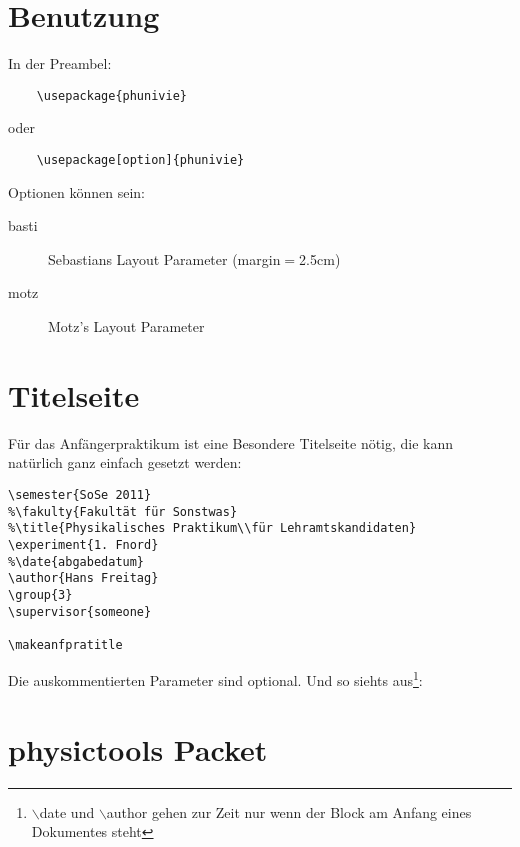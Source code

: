 \documentclass[a4paper]{article}
\begin{document}
\section{Benutzung}

In der Preambel:

\begin{verbatim}
	\usepackage{phunivie}
\end{verbatim}

oder

\begin{verbatim}
	\usepackage[option]{phunivie}
\end{verbatim}

Optionen können sein: 

\begin{description}
	\item[basti] Sebastians Layout Parameter (margin$=$2.5cm)
	\item[motz] Motz's Layout Parameter
\end{description}
	

\section{Titelseite}

Für das Anfängerpraktikum ist eine Besondere Titelseite nötig, die 
kann natürlich ganz einfach gesetzt werden:

\begin{verbatim}
\semester{SoSe 2011}
%\fakulty{Fakultät für Sonstwas}
%\title{Physikalisches Praktikum\\für Lehramtskandidaten}
\experiment{1. Fnord}
%\date{abgabedatum}
\author{Hans Freitag}
\group{3}
\supervisor{someone}

\makeanfpratitle
\end{verbatim}

Die auskommentierten Parameter sind optional. Und so siehts 
aus\footnote{$\backslash$date und $\backslash$author gehen zur Zeit nur wenn der Block am 
Anfang eines Dokumentes steht}:

\makeanfpratitle


\section{physictools Packet}
\end{document}
